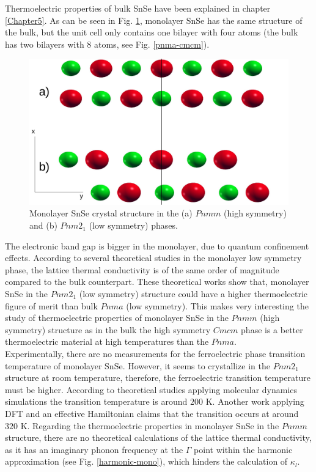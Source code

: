 Thermoelectric properties of bulk SnSe have been explained in chapter \ref{Chapter5}. As can be seen in 
Fig. \ref{pnma-cmcm-mono}, monolayer SnSe has the same structure of the bulk, but the unit cell only contains one 
bilayer with four atoms (the bulk has two bilayers with 8 atoms, see Fig. \ref{pnma-cmcm}). 
\begin{figure}[h]
\begin{center}
\includegraphics[width=0.8\linewidth]{Figures/monolayer-structure-new.pdf}
	\caption[Monolayer SnSe crystal structure]{Monolayer SnSe crystal structure in the (a) $Pnmm$ (high symmetry) 
	and (b) $Pnm2_{1}$ (low symmetry) phases.}
\label{pnma-cmcm-mono}
\end{center}
\end{figure}
The electronic band gap is bigger in the monolayer\cite{wang2015thermoelectric,hu2017high}, due to quantum 
confinement effects. According to several theoretical studies\cite{wang2015thermoelectric,hu2017high} in the 
monolayer low symmetry phase, the lattice thermal conductivity is of the same order of magnitude compared to the 
bulk counterpart. These theoretical works show that, monolayer SnSe in the $Pnm2_{1}$ (low symmetry) structure could 
have a higher thermoelectric figure of merit\cite{wang2015thermoelectric,hu2017high} than bulk $Pnma$ (low symmetry). This makes very interesting the study of thermoelectric properties of monolayer SnSe in the $Pnmm$ (high 
symmetry) structure as in the bulk the high symmetry $Cmcm$ phase is a better thermoelectric material at high 
temperatures than the $Pnma$. \\

Experimentally, there are no measurements for the ferroelectric phase transition temperature of monolayer SnSe. 
However, it seems to crystallize in the $Pnm2_{1}$ structure at room 
temperature\cite{li2013single,chang2020controlled}, 
therefore, the ferroelectric transition temperature must be higher. According to theoretical studies applying 
molecular dynamics simulations\cite{mehboudi2016structural,barraza2018tuning} the transition temperature is around 
$200$ K. Another work applying DFT and an effective Hamiltonian claims\cite{fei2016ferroelectricity} that the 
transition occurs at around $320$ K. Regarding the thermoelectric properties in monolayer SnSe in the $Pnmm$ 
structure, there are no theoretical calculations of the lattice thermal conductivity, as it has an imaginary phonon 
frequency at the $\Gamma$ point within the harmonic approximation (see Fig. \ref{harmonic-mono}), which hinders the 
calculation of $\kappa_{l}$. \\

